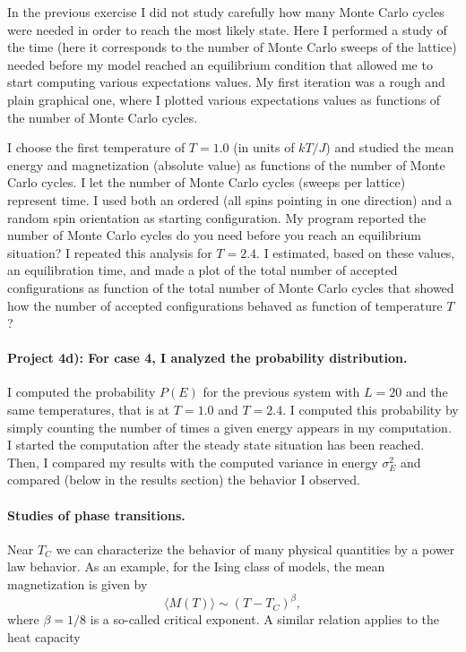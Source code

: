 \documentclass[10pt,showpacs,preprintnumbers,footinbib,amsmath,amssymb,aps,prl,twocolumn,groupedaddress,superscriptaddress,showkeys]{revtex4-1}
\begin{document}
In the previous exercise  I did not study carefully how many Monte Carlo cycles were needed in order to reach the most likely state. Here
I performed a study of the time (here it corresponds to the number 
of Monte Carlo sweeps of the lattice) needed before my model reached an equilibrium condition 
that allowed me to start computing various expectations values. My 
first iteration was a rough and plain graphical
one, where I plotted various expectations values as functions of the number of Monte Carlo cycles.

I choose the first temperature of $T=1.0$ (in units of $kT/J$) and studied the 
mean energy and magnetization (absolute value) as functions of the number of Monte Carlo cycles. I let the number of Monte Carlo cycles (sweeps per lattice) represent time.
I used both an ordered (all spins pointing in one direction) and a random
spin orientation as starting configuration. 
My program reported the number of Monte Carlo cycles do you need before you reach an equilibrium situation?
I repeated this analysis for $T=2.4$. 
I estimated, based on these values, an equilibration time, and made
 a plot of the total number of accepted configurations 
as function of the total number of Monte Carlo cycles that showed how the number of accepted configurations behaved as function of temperature $T$?

\paragraph{Project 4d): For case 4, I analyzed the probability distribution.}
I computed the probability
$P(E)$ for the previous system with $L=20$ and the same temperatures, that is at $T=1.0$ and $T=2.4$.
I computed this probability by simply counting the number of times a 
given energy appears in my computation. I started the computation after 
the steady state situation has been reached. Then, I compared my results with the computed variance in energy
$\sigma^2_E$ and compared (below in the results section) the behavior I observed. 

\paragraph{Studies of phase transitions.}
Near $T_C$ we can characterize the behavior of many physical quantities
by a power law behavior.
As an example, for the Ising class of models, 
the mean magnetization is given by
\[
  \langle M(T) \rangle \sim \left(T-T_C\right)^{\beta},
\]
where $\beta=1/8$ is a so-called critical exponent. A similar relation
applies to the heat capacity
\end{document}
